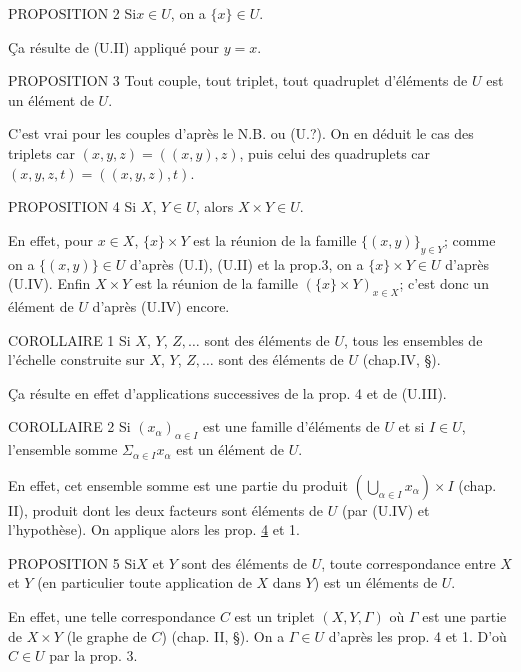 \documentclass[10pt]{../fichiers-configuration-latex/smfart}
\begin{document}
\begin{enonce*}{PROPOSITION 2}
Si\pageoriginale $x\in U$, on a $\{x\}\in U$.
\end{enonce*}
\c Ca résulte de (U.II) appliqué pour $y=x$.

\begin{enonce*}{PROPOSITION 3}
Tout couple, tout triplet, tout quadruplet d'éléments de $U$ est un
élément de $U$.
\end{enonce*}
C'est vrai pour les couples d'après le N.B. ou (U.?). On en déduit
le cas des triplets car $(x,y,z)=((x,y),z)$, puis celui des
quadruplets car $(x,y,z,t)=((x,y,z),t)$.

\begin{enonce*}{PROPOSITION 4}
Si $X$, $Y\in U$, alors $X\times Y\in U$.
\end{enonce*}
En effet, pour $x\in X$, $\{x\}\times Y$ est la réunion de la
famille $\{(x,y)\}_{y\in Y}$; comme on a $\{(x,y)\}\in U$ d'après
(U.I), (U.II) et la prop.3, on a $\{x\}\times Y\in U$ d'après
(U.IV). Enfin $X\times Y$ est la réunion de la famille $(\{x\}\times
Y)_{x\in X}$; c'est donc un élément de $U$ d'après (U.IV) encore.

\begin{enonce*}{COROLLAIRE 1}
Si $X$, $Y$, $Z,\ldots$ sont des éléments de $U$, tous les ensembles
de l'échelle construite sur $X$, $Y$, $Z,\ldots$ sont des éléments
de $U$ {\rm(\cf chap.IV, \S)}.
\end{enonce*}

\c Ca résulte en effet d'applications successives de la prop. 4 et
de (U.III).

\begin{enonce*}{COROLLAIRE 2}
Si $(x_{\alpha})_{\alpha \in I}$ est une famille d'éléments de $U$
et si $I\in U$, l'ensemble somme $\Sigma_{\alpha \in I} x_{\alpha}$
est un élément de $U$.
\end{enonce*}
En effet, cet ensemble somme est une partie du produit
$(\bigcup_{\alpha\in I} x_{\alpha})\times I$ (chap. II), produit
dont les deux facteurs sont éléments de $U$ (par (U.IV) et
l'hypothèse). On applique alors les prop. \hyperref[I.sec4]{4} et 1.

\begin{enonce*}{PROPOSITION 5}
Si\pageoriginale $X$ et $Y$ sont des éléments de $U$, toute
correspondance entre $X$ et $Y$ (en particulier toute application de
$X$ dans $Y$) est un éléments de $U$.
\end{enonce*}
En effet, une telle correspondance $C$ est un triplet $(X,Y,\Gamma)$
où $\Gamma$ est une partie de $X\times Y$ (le graphe de $C$) (chap.
II, \S). On a $\Gamma\in U$ d'après les prop. 4 et 1. D'où $C\in U$
par la prop. 3.
\end{document}
